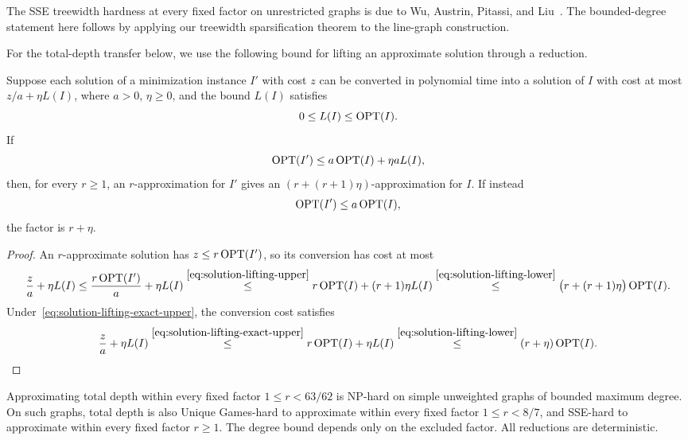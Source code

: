 The SSE treewidth hardness at every fixed factor on unrestricted
graphs is due to Wu, Austrin, Pitassi, and Liu~\cite[Theorem~1.1]{APW}. The bounded-degree
statement here follows by applying our treewidth sparsification
theorem to the line-graph construction.

For the total-depth transfer below, we use the following bound for
lifting an approximate solution through a reduction.

\begin{lemma}
\label{lem:solution-lifting}
Suppose each solution of a minimization instance $I'$ with cost $z$
can be converted in polynomial time into a solution of $I$ with cost
at most $z/a+\eta L(I)$, where $a>0$, $\eta\ge0$, and the bound $L(I)$ satisfies
\begin{equation}\label{eq:solution-lifting-lower}
 0\le L(I)\le\operatorname{OPT}(I).
\end{equation}
If
\begin{equation}\label{eq:solution-lifting-upper}
 \operatorname{OPT}(I')\le a\operatorname{OPT}(I)+\eta aL(I),
\end{equation}
then, for every $r\ge1$, an $r$-approximation for
$I'$ gives an $(r+(r+1)\eta)$-approximation for $I$. If instead
\begin{equation}\label{eq:solution-lifting-exact-upper}
 \operatorname{OPT}(I')\le a\operatorname{OPT}(I),
\end{equation}
the factor is $r+\eta$.
\end{lemma}

\begin{proof}
An $r$-approximate solution has $z\le r\operatorname{OPT}(I')$, so its conversion
has cost at most
\[
\frac za+\eta L(I)
 \le\frac{r\operatorname{OPT}(I')}{a}+\eta L(I) \overset{\eqref{eq:solution-lifting-upper}}{\le}
 r\operatorname{OPT}(I)+(r+1)\eta L(I)
 \overset{\eqref{eq:solution-lifting-lower}}{\le}
 \bigl(r+(r+1)\eta\bigr)\operatorname{OPT}(I).
\]
Under~\eqref{eq:solution-lifting-exact-upper}, the conversion cost satisfies
\[
 \frac za+\eta L(I)
 \overset{\eqref{eq:solution-lifting-exact-upper}}{\le}r\operatorname{OPT}(I)+\eta L(I)
 \overset{\eqref{eq:solution-lifting-lower}}{\le}(r+\eta)\operatorname{OPT}(I).
\]
\end{proof}

\begin{corollary}
\label{cor:total-depth-bounded-degree}
\label{thm:np-total-depth-bounded-degree}
\label{thm:total-depth-ugc-bounded-degree}
\label{cor:total-depth-sse-bounded-degree}
Approximating total depth within every fixed factor $1\le r<63/62$
is NP-hard on simple unweighted graphs of bounded maximum degree.
On such graphs,
total depth is also Unique Games-hard to approximate within every
fixed factor $1\le r<8/7$, and SSE-hard to approximate within every
fixed factor $r\ge1$. The degree bound depends only on the excluded
factor. All reductions are deterministic.
\end{corollary}


